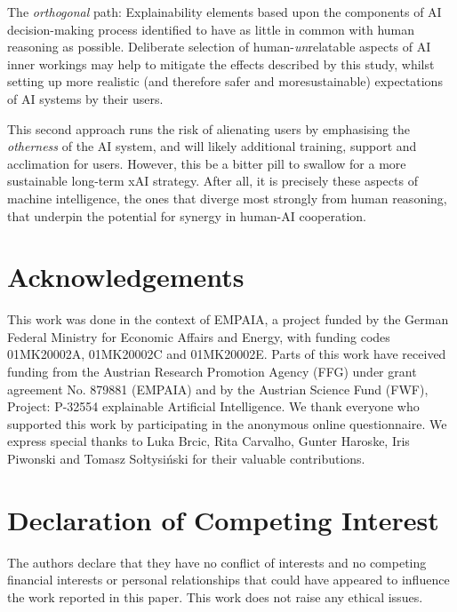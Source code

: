 \documentclass[final,5p,times,twocolumn,hyphens]{elsarticle}
\begin{document}
The \textit{orthogonal} path: Explainability elements based upon the components of AI decision-making process identified to have as little in common with human reasoning as possible. Deliberate selection of human-\textit{un}relatable aspects of AI inner workings may help to mitigate the effects described by this study, whilst setting up more realistic (and therefore safer and moresustainable) expectations of AI systems by their users.

This second approach runs the risk of alienating users by emphasising the \textit{otherness} of the AI system, and will likely additional training, support and acclimation for users. However, this be a bitter pill to swallow for a more sustainable long-term xAI strategy. After all, it is precisely these aspects of machine intelligence, the ones that diverge most strongly from human reasoning, that underpin the potential for synergy in human-AI cooperation.

\section*{Acknowledgements}

This work was done in the context of EMPAIA, a project funded by the German Federal Ministry for Economic Affairs and Energy, with funding codes 01MK20002A, 01MK20002C and 01MK20002E. Parts of this work have received funding from the Austrian Research Promotion Agency (FFG) under grant agreement No. 879881 (EMPAIA) and by the Austrian Science Fund (FWF), Project: P-32554 explainable Artificial Intelligence. We thank everyone who supported this work by participating in the anonymous online questionnaire. We express special thanks to Luka Brcic, Rita Carvalho, Gunter Haroske, Iris Piwonski and Tomasz Sołtysiński for their valuable contributions. 

\section*{Declaration of Competing Interest}

The authors declare that they have no conflict of interests and no competing financial interests or personal relationships that could have appeared to influence the work reported in this paper. This work does not raise any ethical issues.


\end{document}
